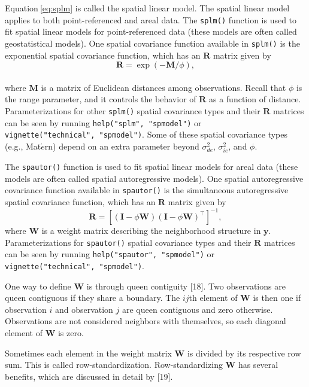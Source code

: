 \documentclass[10pt,letterpaper]{article}
\begin{document}
Equation\(~\)\ref{eq:splm} is called the spatial linear model. The
spatial linear model applies to both point-referenced and areal data.
The \texttt{splm()} function is used to fit spatial linear models for
point-referenced data (these models are often called geostatistical
models). One spatial covariance function available in \texttt{splm()} is
the exponential spatial covariance function, which has an \(\mathbf{R}\)
matrix given by \begin{equation*}
  \mathbf{R} = \exp(-\mathbf{M} / \phi),
\end{equation*}\\
where \(\mathbf{M}\) is a matrix of Euclidean distances among
observations. Recall that \(\phi\) is the range parameter, and it
controls the behavior of \(\mathbf{R}\) as a function of distance.
Parameterizations for other \texttt{splm()} spatial covariance types and
their \(\mathbf{R}\) matrices can be seen by running
\texttt{help("splm",\ "spmodel")} or
\texttt{vignette("technical",\ "spmodel")}. Some of these spatial
covariance types (e.g., Mat\(\acute{e}\)rn) depend on an extra parameter
beyond \(\sigma^2_{de}\), \(\sigma^2_{ie}\), and \(\phi\).

The \texttt{spautor()} function is used to fit spatial linear models for
areal data (these models are often called spatial autoregressive
models). One spatial autoregressive covariance function available in
\texttt{spautor()} is the simultaneous autoregressive spatial covariance
function, which has an \(\mathbf{R}\) matrix given by \begin{equation*}
  \mathbf{R} = [(\mathbf{I} - \phi \mathbf{W})(\mathbf{I} - \phi \mathbf{W})^\top]^{-1},
\end{equation*} where \(\mathbf{W}\) is a weight matrix describing the
neighborhood structure in \(\mathbf{y}\). Parameterizations for
\texttt{spautor()} spatial covariance types and their \(\mathbf{R}\)
matrices can be seen by running \texttt{help("spautor",\ "spmodel")} or
\texttt{vignette("technical",\ "spmodel")}.

One way to define \(\mathbf{W}\) is through queen contiguity {[}18{]}.
Two observations are queen contiguous if they share a boundary. The
\(ij\)th element of \(\mathbf{W}\) is then one if observation \(i\) and
observation \(j\) are queen contiguous and zero otherwise. Observations
are not considered neighbors with themselves, so each diagonal element
of \(\mathbf{W}\) is zero.

Sometimes each element in the weight matrix \(\mathbf{W}\) is divided by
its respective row sum. This is called row-standardization.
Row-standardizing \(\mathbf{W}\) has several benefits, which are
discussed in detail by {[}19{]}.
\end{document}
